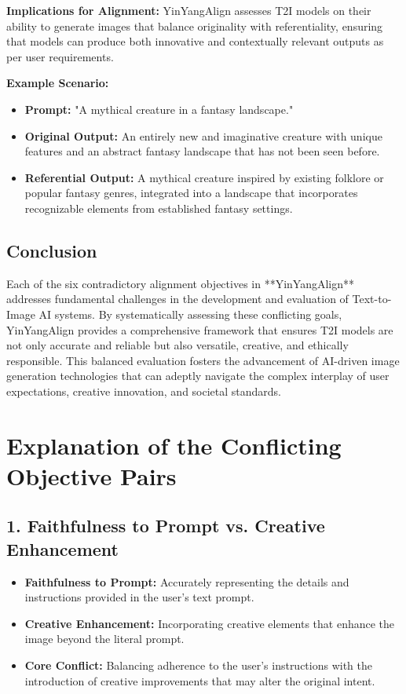 \textbf{Implications for Alignment:}
YinYangAlign assesses T2I models on their ability to generate images that balance originality with referentiality, ensuring that models can produce both innovative and contextually relevant outputs as per user requirements.

\textbf{Example Scenario:}
\begin{itemize}
    \item \textbf{Prompt:} "A mythical creature in a fantasy landscape."
    \item \textbf{Original Output:} An entirely new and imaginative creature with unique features and an abstract fantasy landscape that has not been seen before.
    \item \textbf{Referential Output:} A mythical creature inspired by existing folklore or popular fantasy genres, integrated into a landscape that incorporates recognizable elements from established fantasy settings.
\end{itemize}

\subsection{Conclusion}

Each of the six contradictory alignment objectives in **YinYangAlign** addresses fundamental challenges in the development and evaluation of Text-to-Image AI systems. By systematically assessing these conflicting goals, YinYangAlign provides a comprehensive framework that ensures T2I models are not only accurate and reliable but also versatile, creative, and ethically responsible. This balanced evaluation fosters the advancement of AI-driven image generation technologies that can adeptly navigate the complex interplay of user expectations, creative innovation, and societal standards.





\section{Explanation of the Conflicting Objective Pairs}

\subsection{1. Faithfulness to Prompt vs. Creative Enhancement}
\begin{itemize}
    \item \textbf{Faithfulness to Prompt:} Accurately representing the details and instructions provided in the user’s text prompt.
    \item \textbf{Creative Enhancement:} Incorporating creative elements that enhance the image beyond the literal prompt.
    \item \textbf{Core Conflict:} Balancing adherence to the user’s instructions with the introduction of creative improvements that may alter the original intent.
\end{itemize}

